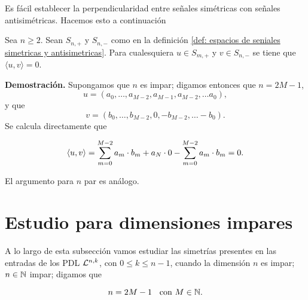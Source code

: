 Es fácil establecer la perpendicularidad entre
señales simétricas con señales antisimétricas.
Hacemos esto a continuación

\begin{lema}
\label{lema: ortogonalidad entre sim y antisim}
Sea $n \geq 2$.
Sean $S_{n,+}$ y $S_{n,-}$ como en la definición
\ref{def: espacios de seniales simetricas y antisimetricas}.
Para cualesquiera 
$u \in S_{m,+}$ y $v \in S_{n,-}$ se tiene que
$\langle u, v \rangle=0$.
\end{lema}
\noindent
\textbf{Demostración.}
Supongamos que $n$ es impar; digamos entonces que
$n = 2M-1$, 
\begin{equation*}
u=(a_{0}, \ldots , a_{M-2}, a_{M-1}, a_{M-2}, \ldots a_{0}),
\end{equation*}
y que 
\begin{equation*}
v=(b_{0}, \ldots , b_{M-2}, 0, -b_{M-2}, \ldots -b_{0}).
\end{equation*}
Se calcula directamente que 

\[
\langle u, v \rangle = \sum\limits_{m=0}^{M-2}a_{m} \cdot b_{m} + a_{N} \cdot 0
-\sum\limits_{m=0}^{M-2}a_{m} \cdot b_{m} =0.
\]

\noindent
El argumento para $n$ par es análogo.
\QEDB
\vspace{0.2cm}

\section{Estudio para dimensiones impares}
A lo largo de esta subsección vamos 
estudiar las simetrías presentes en las entradas
de los PDL $\mathcal{L}^{n,k}$, con $0 \leq k \leq n-1$,
cuando la dimensión $n$ es impar;
$n \in \mathbb{N}$ impar; digamos que

\begin{equation}
\label{eq1: 19En}
n=2M - 1 \hspace{0.2cm} \text{ con } M \in \mathbb{N}.
\end{equation}

